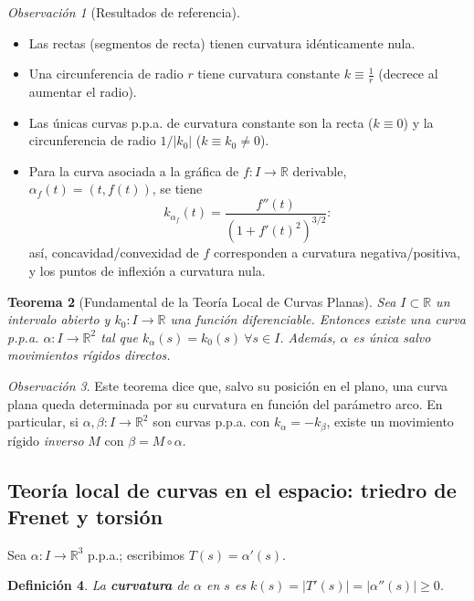 \documentclass[11pt]{article}
\theoremstyle{plain}
\newtheorem{teorema}{Teorema}[section]
\newtheorem{definicion}[teorema]{Definición}
\theoremstyle{definition}
\theoremstyle{remark}
\newtheorem{observacion}[teorema]{Observación}
\begin{document}
\begin{observacion}[Resultados de referencia]\
\begin{itemize}
\item Las rectas (segmentos de recta) tienen curvatura idénticamente nula.
\item Una circunferencia de radio $r$ tiene curvatura constante $k\equiv\tfrac1r$ (decrece al aumentar el radio).
\item Las únicas curvas p.p.a. de curvatura constante son la recta ($k\equiv0$) y la circunferencia de radio $1/|k_0|$ ($k\equiv k_0\neq0$).
\item Para la curva asociada a la gráfica de $f:I\to\mathbb{R}$ derivable, $\alpha_f(t)=(t,f(t))$, se tiene
\[
k_{\alpha_f}(t)=\frac{f''(t)}{(1+f'(t)^2)^{3/2}}:
\]
así, concavidad/convexidad de $f$ corresponden a curvatura negativa/positiva, y los puntos de inflexión a curvatura nula.
\end{itemize}
\end{observacion}

\begin{teorema}[Fundamental de la Teoría Local de Curvas Planas]
Sea $I\subset\mathbb{R}$ un intervalo abierto y $k_0:I\to\mathbb{R}$ una función diferenciable. Entonces existe una curva p.p.a. $\alpha:I\to\mathbb{R}^2$ tal que $k_\alpha(s)=k_0(s)\ \forall s\in I$. Además, $\alpha$ es única salvo movimientos rígidos directos.
\end{teorema}

\begin{observacion}
Este teorema dice que, salvo su posición en el plano, una curva plana queda determinada por su curvatura en función del parámetro arco. En particular, si $\alpha,\beta:I\to\mathbb{R}^2$ son curvas p.p.a. con $k_\alpha=-k_\beta$, existe un movimiento rígido \emph{inverso} $M$ con $\beta=M\circ\alpha$.
\end{observacion}

\subsection{Teoría local de curvas en el espacio: triedro de Frenet y torsión}

Sea $\alpha:I\to\mathbb{R}^3$ p.p.a.; escribimos $T(s)=\alpha'(s)$.

\begin{definicion}
La \textbf{curvatura} de $\alpha$ en $s$ es $k(s)=|T'(s)|=|\alpha''(s)|\ge0$.
\end{definicion}
\end{document}

